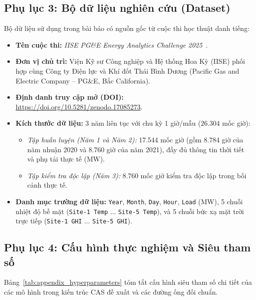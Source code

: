 \subsection*{Phụ lục 3: Bộ dữ liệu nghiên cứu (Dataset)}
\label{subsec:appendix_dataset}

Bộ dữ liệu sử dụng trong bài báo có nguồn gốc từ cuộc thi học thuật danh tiếng:
\begin{itemize}
    \item \textbf{Tên cuộc thi:} \textit{IISE PG\&E Energy Analytics Challenge 2025}~\cite{pge2025zenodo}.
    \item \textbf{Đơn vị chủ trì:} Viện Kỹ sư Công nghiệp và Hệ thống Hoa Kỳ (IISE) phối hợp cùng Công ty Điện lực và Khí đốt Thái Bình Dương (Pacific Gas and Electric Company -- PG\&E, Bắc California).
    \item \textbf{Định danh truy cập mở (DOI):} \url{https://doi.org/10.5281/zenodo.17085273}.
    \item \textbf{Kích thước dữ liệu:} 3 năm liên tục với chu kỳ 1 giờ/mẫu ($26.304$ mốc giờ):
    \begin{itemize}
        \item \textit{Tập huấn luyện (Năm 1 và Năm 2):} 17.544 mốc giờ (gồm 8.784 giờ của năm nhuận 2020 và 8.760 giờ của năm 2021), đầy đủ thông tin thời tiết và phụ tải thực tế ($\text{MW}$).
        \item \textit{Tập kiểm tra độc lập (Năm 3):} 8.760 mốc giờ kiểm tra độc lập trong bối cảnh thực tế.
    \end{itemize}
    \item \textbf{Danh mục trường dữ liệu:} \texttt{Year}, \texttt{Month}, \texttt{Day}, \texttt{Hour}, \texttt{Load} (MW), 5 chuỗi nhiệt độ bề mặt (\texttt{Site-1 Temp} $\ldots$ \texttt{Site-5 Temp}), và 5 chuỗi bức xạ mặt trời trực tiếp (\texttt{Site-1 GHI} $\ldots$ \texttt{Site-5 GHI}).
\end{itemize}

\subsection*{Phụ lục 4: Cấu hình thực nghiệm và Siêu tham số}
\label{subsec:appendix_hyperparameters}

Bảng~\ref{tab:appendix_hyperparameters} tóm tắt cấu hình siêu tham số chi tiết của các mô hình trong kiến trúc CAS đề xuất và các đường ống đối chuẩn.

